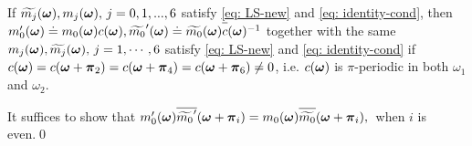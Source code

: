\begin{comment}
Let $C_{\V{\omega}} = det(\M[-k_{\V{\omega}},:])$, then we have the following observation.
\begin{lemma}\label{lem: equal-det}
$C_{\V{\omega}} = C_{\V{\omega}+\V{\pi}_2} = C_{\V{\omega}+\V{\pi}_4} = C_{\V{\omega}+\V{\pi}_6}$
\end{lemma}
\noindent{\it Proof}
Because $\widetilde{M}(\V{\omega}+\V{\pi}_2) = P_{\V{\pi}_2}\M(\V{\omega})$ where $P_{\V{\pi}_2}$ is a row permutation matrix, it follows from the definition of $C_{\V{\omega}}$ that 
$C_{\V{\omega}} = det\big(\M[-k_{\V{\omega}},:](\V{\omega})\big) = det\big(\M[-k_{\V{\omega}+\V{\pi}_2},:](\V{\omega}+\V{\pi}_2) \big)= C_{\V{\omega}+\V{\pi}_2}$ where 
$\mathbf{1}_{k_{\V{\omega}+\V{\pi}_2}} = P_{\V{\pi}_2}\mathbf{1}_{k_{\V{\omega}}}$.
\qed\\[1em]
We assume that $m_0\in\mathbb{R}_{\geq 0}$ without phase. Let $m_0^C(\V{\omega}) = m_0(\V{\omega})|C_{\V{\omega}}|\in \mathbb{R}_{\geq 0}$ and $\mc{0} = \m{0}/|C_{\V{\omega}}|$, then Lemma \ref{lem: equal-det} implies the following.
\end{comment}


\begin{proposition}\label{prop: mc}
If $\widetilde{m_{j}}(\boldsymbol{\omega}), m_j(\boldsymbol{\omega}),\,  j = 0,1,...,6$ satisfy \eqref{eq: LS-new} and \eqref{eq: identity-cond}, 
then $m_0'(\V{\omega})\doteq m_0(\V{\omega})c(\V{\omega}), \widetilde{m_0}'(\V{\omega})\doteq \m{0}\overlinespace{c}(\V{\omega})^{-1}$ together with the same $m_j(\boldsymbol{\omega}),\widetilde{m_{j}}(\boldsymbol{\omega}), \, j = 1,\cdots,6$ 
satisfy \eqref{eq: LS-new} and \eqref{eq: identity-cond} if $ c(\boldsymbol{\omega}) = c(\boldsymbol{\omega}+\boldsymbol{\pi}_2)=c(\boldsymbol{\omega}+\boldsymbol{\pi}_4) = c(\boldsymbol{\omega}+\boldsymbol{\pi}_6) \neq 0$, i.e. $c(\boldsymbol{\omega})$ is $\pi$-periodic in both $\omega_1$ and $\omega_2$.
\end{proposition}
It suffices to show that $m_0'(\V{\omega})\overline{\widetilde{m_0}'}(\V{\omega} + \V{\pi}_i) = m_0(\V{\omega})\sbarmp{0}{i},\,$ when $i$ is even.\qed


